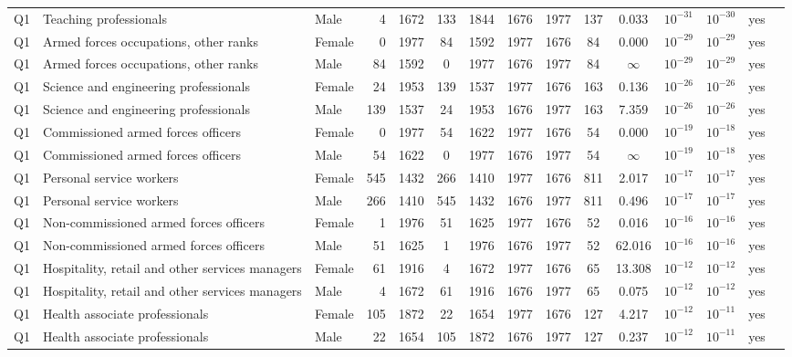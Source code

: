 \begin{longtable}{lllrcccccccccll}
Q1 & Teaching professionals & Male & 4 & 1672 & 133 & 1844 & 1676 & 1977 & 137 & 0.033 & $10^{-31}$ & $10^{-30}$ & yes \\
Q1 & Armed forces occupations, other ranks & Female & 0 & 1977 & 84 & 1592 & 1977 & 1676 & 84 & 0.000 & $10^{-29}$ & $10^{-29}$ & yes \\
Q1 & Armed forces occupations, other ranks & Male & 84 & 1592 & 0 & 1977 & 1676 & 1977 & 84 & $\infty$ & $10^{-29}$ & $10^{-29}$ & yes \\
Q1 & Science and engineering professionals & Female & 24 & 1953 & 139 & 1537 & 1977 & 1676 & 163 & 0.136 & $10^{-26}$ & $10^{-26}$ & yes \\
Q1 & Science and engineering professionals & Male & 139 & 1537 & 24 & 1953 & 1676 & 1977 & 163 & 7.359 & $10^{-26}$ & $10^{-26}$ & yes \\
Q1 & Commissioned armed forces officers & Female & 0 & 1977 & 54 & 1622 & 1977 & 1676 & 54 & 0.000 & $10^{-19}$ & $10^{-18}$ & yes \\
Q1 & Commissioned armed forces officers & Male & 54 & 1622 & 0 & 1977 & 1676 & 1977 & 54 & $\infty$ & $10^{-19}$ & $10^{-18}$ & yes \\
Q1 & Personal service workers & Female & 545 & 1432 & 266 & 1410 & 1977 & 1676 & 811 & 2.017 & $10^{-17}$ & $10^{-17}$ & yes \\
Q1 & Personal service workers & Male & 266 & 1410 & 545 & 1432 & 1676 & 1977 & 811 & 0.496 & $10^{-17}$ & $10^{-17}$ & yes \\
Q1 & Non-commissioned armed forces officers & Female & 1 & 1976 & 51 & 1625 & 1977 & 1676 & 52 & 0.016 & $10^{-16}$ & $10^{-16}$ & yes \\
Q1 & Non-commissioned armed forces officers & Male & 51 & 1625 & 1 & 1976 & 1676 & 1977 & 52 & 62.016 & $10^{-16}$ & $10^{-16}$ & yes \\
Q1 & Hospitality, retail and other services managers & Female & 61 & 1916 & 4 & 1672 & 1977 & 1676 & 65 & 13.308 & $10^{-12}$ & $10^{-12}$ & yes \\
Q1 & Hospitality, retail and other services managers & Male & 4 & 1672 & 61 & 1916 & 1676 & 1977 & 65 & 0.075 & $10^{-12}$ & $10^{-12}$ & yes \\
Q1 & Health associate professionals & Female & 105 & 1872 & 22 & 1654 & 1977 & 1676 & 127 & 4.217 & $10^{-12}$ & $10^{-11}$ & yes \\
Q1 & Health associate professionals & Male & 22 & 1654 & 105 & 1872 & 1676 & 1977 & 127 & 0.237 & $10^{-12}$ & $10^{-11}$ & yes \\

\end{longtable}
